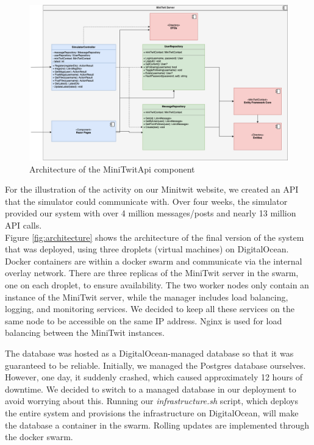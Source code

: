 \begin{figure}[H]
    \centering
    \includegraphics[width=\textwidth]{images/miniTwitServerOverview.png}
    \caption{Architecture of the MiniTwitApi component}
    \label{fig:miniTwitApiOverview}
\end{figure}

For the illustration of the activity on our Minitwit website, we created an API that the simulator could communicate with. Over four weeks, the simulator provided our system with over 4 million messages/posts and nearly 13 million API calls. \\

Figure \ref{fig:architecture} shows the architecture of the final version of the system that was deployed, using three droplets (virtual machines) on DigitalOcean. Docker containers are within a docker swarm and communicate via the internal overlay network. There are three replicas of the MiniTwit server in the swarm, one on each droplet, to ensure availability. The two worker nodes only contain an instance of the MiniTwit server, while the manager includes load balancing, logging, and monitoring services. We decided to keep all these services on the same node to be accessible on the same IP address. Nginx is used for load balancing between the MiniTwit instances.

The database was hosted as a DigitalOcean-managed database so that it was guaranteed to be reliable. Initially, we managed the Postgres database ourselves. However, one day, it suddenly crashed, which caused approximately 12 hours of downtime. We decided to switch to a managed database in our deployment to avoid worrying about this. Running our \textit{infrastructure.sh} script, which deploys the entire system and provisions the infrastructure on DigitalOcean, will make the database a container in the swarm. Rolling updates are implemented through the docker swarm.

